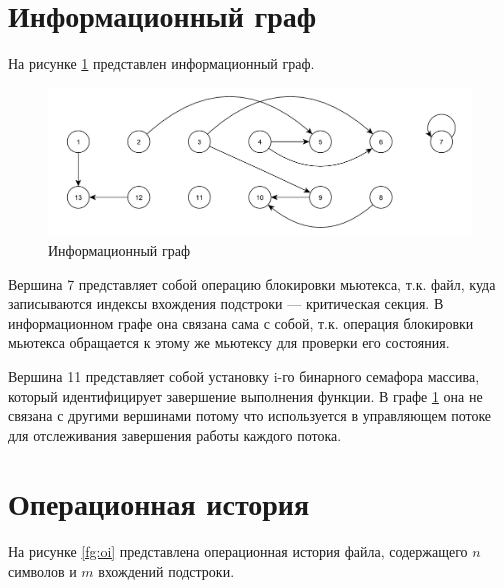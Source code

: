 \clearpage

\section{Информационный граф}

На рисунке \ref{fg:ig} представлен информационный граф.

\begin{figure}[h]
	\centering
	\includegraphics[height=0.23\textheight]{images/ИГ.pdf}
	\caption{Информационный граф}
	\label{fg:ig}
\end{figure}

Вершина 7 представляет собой операцию блокировки мьютекса, т.к. файл, куда записываются индексы вхождения подстроки --- критическая секция.
В информационном графе она связана сама с собой, т.к. операция блокировки мьютекса обращается к этому же мьютексу для проверки его состояния.

Вершина 11 представляет собой установку i-го бинарного семафора массива, который идентифицирует завершение выполнения функции.
В графе \ref{fg:ig} она не связана с другими вершинами потому что используется в управляющем потоке для отслеживания завершения работы каждого потока.

\clearpage

\section{Операционная история}

На рисунке \ref{fg:oi} представлена операционная история файла, содержащего $n$ символов и $m$ вхождений подстроки. 

